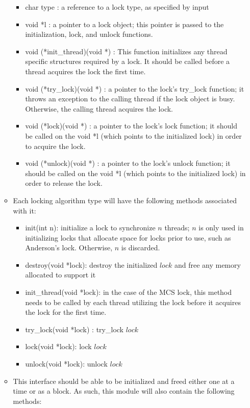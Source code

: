 \documentclass[]{article}
\begin{document}
\begin{itemize}
\begin{itemize}
		\begin{itemize}
			\item char type : a reference to a lock type, as specified by input
			\item void *l : a pointer to a lock object; this pointer is passed to the initialization, lock, and unlock functions.	
			\item void (*init\_thread)(void *) : This function initializes any thread specific structures required by a lock. It should be called before a thread acquires the lock the first time.	
			\item void (*try\_lock)(void *) : a pointer to the lock's try\_lock function; it throws an exception to the calling thread if the lock object is busy. Otherwise, the calling thread acquires the lock.
			\item void (*lock)(void *) : a pointer to the lock's lock function; it should be called on the void *l (which points to the initialized lock) in order to acquire the lock. 	
			\item void (*unlock)(void *) : a pointer to the lock's unlock function; it should be called on the void *l (which points to the initialized lock) in order to release the lock. 
		\end{itemize}
		\item Each locking algorithm type will have the following methods associated with it:
		\begin{itemize}
			\item init(int n):  initialize a lock to synchronize $n$ threads; $n$ is only used in initializing locks that allocate space for locks prior to use, such as Anderson's lock. Otherwise, $n$ is discarded.
			\item destroy(void *lock): destroy the initialized $lock$ and free any memory allocated to support it
			\item init\_thread(void *lock): in the case of the MCS lock, this method needs to be called by each thread utilizing the lock before it acquires the lock for the first time.
			\item try\_lock(void *lock) : try\_lock $lock$
			\item lock(void *lock): lock $lock$
			\item unlock(void *lock): unlock $lock$
		\end{itemize}
		\item This interface should be able to be initialized and freed either one at a time or as a block. As such, this module will also contain the following methods:

\end{itemize}
\end{itemize}
\end{document}
